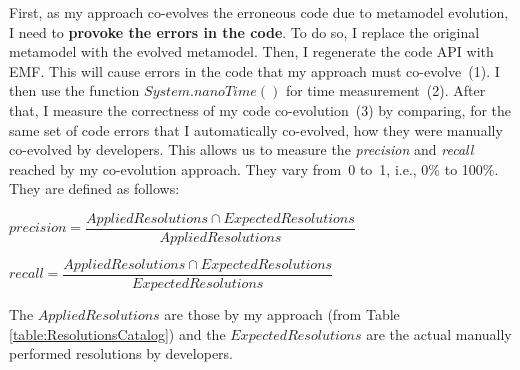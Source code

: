 First, as my approach co-evolves the erroneous code due to metamodel evolution, I need to \textbf{provoke the errors in the code}. To do so, I replace the original metamodel with the evolved metamodel. Then, I regenerate the code API with EMF. This will cause errors in the code that my approach must co-evolve~(1).  
I then use the function $System.nanoTime()$ for time measurement~(2). 
After that, I measure the correctness of my code co-evolution~(3) by comparing, for the same set of code errors that I automatically co-evolved, how they were manually co-evolved by developers. This allows us to measure the \emph{precision} and \emph{recall} reached by my co-evolution approach. They vary from~0 to~1, i.e., 0\% to 100\%. They are defined as follows:
%
%




	
	\vspace{1em}
	\noindent $ precision = \dfrac{Applied Resolutions \cap Expected Resolutions}{Applied Resolutions} $
	
	\vspace{1em}
	
	\noindent $ recall = \dfrac{Applied Resolutions \cap Expected Resolutions}{Expected Resolutions} $
	\vspace{1em}
	
	The $Applied Resolutions$ are those by my approach (from Table \ref{table:ResolutionsCatalog}) and  the $Expected Resolutions$ are the actual manually performed resolutions by developers.  %
	
